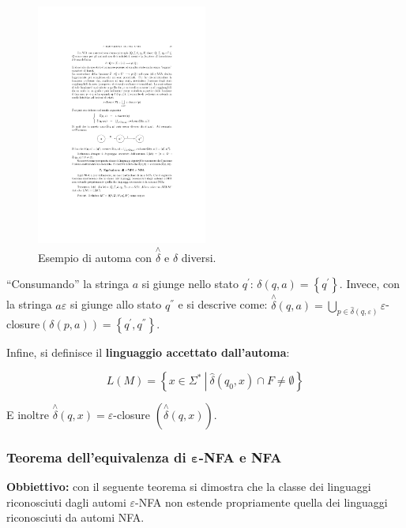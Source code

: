 \documentclass[a4paper]{article}
\newcommand{\dquotes}[1]{``#1''}
\begin{document}
	\begin{figure}[!htp]
		\centering
		\includegraphics[width=0.5\textwidth]{img/automa_epsilon-transizioni.pdf}
		\caption{Esempio di automa con $\overset{\wedge}{\delta}$ e $\delta$ diversi.}
	\end{figure}

	\noindent
	\dquotes{Consumando} la stringa $a$ si giunge nello stato $q^{'}$: $\delta\left(q, a\right) = \left\{q^{'}\right\}$. Invece, con la stringa $a\varepsilon$ si giunge allo stato $q^{''}$ e si descrive come: $\overset{\wedge}{\delta}\left(q,a\right) = \bigcup_{p \in \hat{\delta}\left(q,\varepsilon\right)} \varepsilon$-closure$\left(\delta\left(p,a\right)\right) = \left\{q^{'}, q^{''}\right\}$.
	
	\noindent
	Infine, si definisce il \textcolor{Red3}{\textbf{linguaggio accettato dall'automa}}:
	
	\begin{equation*}
		L\left(M\right) = \left\{x \in \Sigma^{*} \: \left| \: \hat{\delta}\left(q_{0}, x\right) \cap F \ne \emptyset\right.\right\}
	\end{equation*}

	\noindent
	E inoltre $\overset{\wedge}{\delta}\left(q,x\right) = \varepsilon$-closure $\left(\overset{\wedge}{\delta}\left(q,x\right)\right)$.
	
	\subsubsection{Teorema dell'equivalenza di $\boldsymbol{\varepsilon}$-NFA e NFA}
	
	\textbf{Obbiettivo:} con il seguente teorema si dimostra che la classe dei linguaggi riconosciuti dagli automi $\varepsilon$-NFA non estende propriamente quella dei linguaggi riconosciuti da automi NFA.
	
\end{document}
